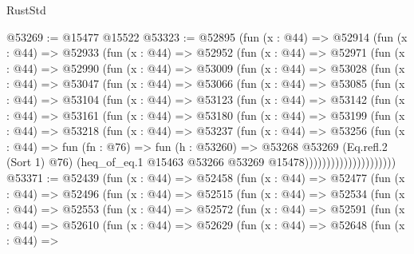 \begin{lexlean}{RustStd}
\begin{coremodule}
@53269 := @15477 @15522
@53323 := @52895
    (fun (x : @44) =>
    @52914
      (fun (x : @44) =>
      @52933
        (fun (x : @44) =>
        @52952
          (fun (x : @44) =>
          @52971
            (fun (x : @44) =>
            @52990
              (fun (x : @44) =>
              @53009
                (fun (x : @44) =>
                @53028
                  (fun (x : @44) =>
                  @53047
                    (fun (x : @44) =>
                    @53066
                      (fun (x : @44) =>
                      @53085
                        (fun (x : @44) =>
                        @53104
                          (fun (x : @44) =>
                          @53123
                            (fun (x : @44) =>
                            @53142
                              (fun (x : @44) =>
                              @53161
                                (fun (x : @44) =>
                                @53180
                                  (fun (x : @44) =>
                                  @53199
                                    (fun (x : @44) =>
                                    @53218
                                      (fun (x : @44) =>
                                      @53237
                                        (fun (x : @44) =>
                                        @53256
                                          (fun (x : @44) =>
                                          fun (fn : @76) =>
                                          fun (h : @53260) =>
                                          @53268
                                            @53269
                                            (Eq.refl.{2} (Sort 1) @76)
                                            (heq_of_eq.{1}
                                              @15463
                                              @53266
                                              @53269
                                              @15478)))))))))))))))))))))
@53371 := @52439
    (fun (x : @44) =>
    @52458
      (fun (x : @44) =>
      @52477
        (fun (x : @44) =>
        @52496
          (fun (x : @44) =>
          @52515
            (fun (x : @44) =>
            @52534
              (fun (x : @44) =>
              @52553
                (fun (x : @44) =>
                @52572
                  (fun (x : @44) =>
                  @52591
                    (fun (x : @44) =>
                    @52610
                      (fun (x : @44) =>
                      @52629
                        (fun (x : @44) =>
                        @52648
                          (fun (x : @44) =>

\end{coremodule}
\end{lexlean}
